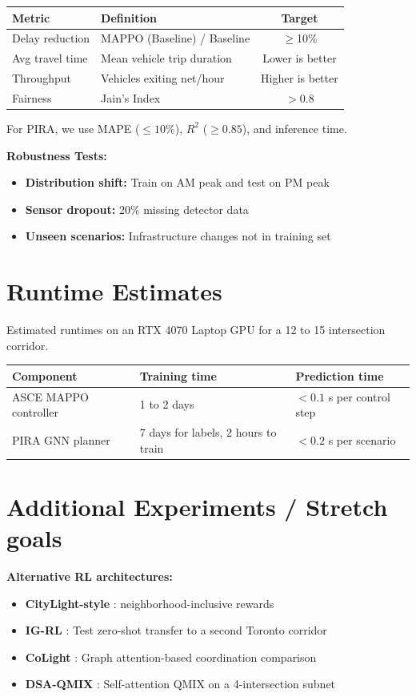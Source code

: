 \documentclass[10pt,twocolumn]{article}
\begin{document}
\begin{center}
\small
\begin{tabular}{@{}llc@{}}
\toprule
\textbf{Metric} & \textbf{Definition} & \textbf{Target} \\
\midrule
Delay reduction & MAPPO (Baseline) / Baseline & $\geq$10\% \\
Avg travel time & Mean vehicle trip duration & Lower is better \\
Throughput & Vehicles exiting net/hour & Higher is better \\
Fairness & Jain's Index & $>0.8$ \\
\bottomrule
\end{tabular}
\end{center}

For PIRA, we use MAPE ($\leq 10\%$), $R^2$ ($\geq 0.85$), and inference time.

\textbf{Robustness Tests:}
\begin{itemize}
    \item \textbf{Distribution shift:} Train on AM peak and test on PM peak
    \item \textbf{Sensor dropout:} 20\% missing detector data
    \item \textbf{Unseen scenarios:} Infrastructure changes not in training set
\end{itemize}

\section{Runtime Estimates}
Estimated runtimes on an RTX 4070 Laptop GPU for a 12 to 15 intersection corridor.
\begin{table}[H]
\centering
\small
\begin{tabularx}{\columnwidth}{@{}l X X@{}}
\toprule
\textbf{Component} & \textbf{Training time} & \textbf{Prediction time} \\
\midrule
ASCE MAPPO controller & 1 to 2 days & $<0.1$ s per control step \\
PIRA GNN planner & 7 days for labels, 2 hours to train & $<0.2$ s per scenario \\
\bottomrule
\end{tabularx}
\end{table}

\section{Additional Experiments / Stretch goals}
\textbf{Alternative RL architectures:}
\begin{itemize}
    \item \textbf{CityLight-style} \cite{citylight}: neighborhood-inclusive rewards 
    \item \textbf{IG-RL} \cite{igrl}: Test zero-shot transfer to a second Toronto corridor
    \item \textbf{CoLight} \cite{colight}: Graph attention-based coordination comparison
    \item \textbf{DSA-QMIX} \cite{dsa_qmix}: Self-attention QMIX on a 4-intersection subnet
\end{itemize}
\end{document}
